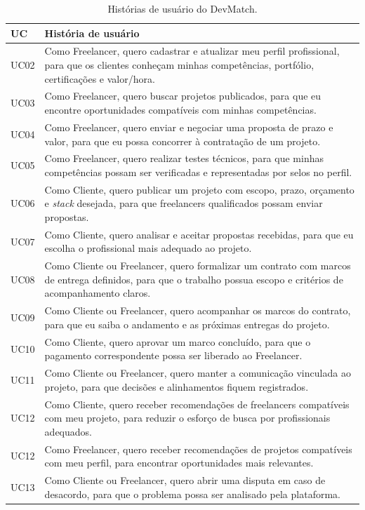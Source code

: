 \begin{table}[!htbp]
\centering
\caption{Histórias de usuário do DevMatch.}
\label{tab:historias}
\small
\begin{tabularx}{\textwidth}{@{}p{0.9cm}X@{}}
\toprule
\textbf{UC} & \textbf{História de usuário} \\
\midrule
UC02 & Como Freelancer, quero cadastrar e atualizar meu perfil profissional, para que os clientes conheçam minhas competências, portfólio, certificações e valor/hora. \\
UC03 & Como Freelancer, quero buscar projetos publicados, para que eu encontre oportunidades compatíveis com minhas competências. \\
UC04 & Como Freelancer, quero enviar e negociar uma proposta de prazo e valor, para que eu possa concorrer à contratação de um projeto. \\
UC05 & Como Freelancer, quero realizar testes técnicos, para que minhas competências possam ser verificadas e representadas por selos no perfil. \\
UC06 & Como Cliente, quero publicar um projeto com escopo, prazo, orçamento e \textit{stack} desejada, para que freelancers qualificados possam enviar propostas. \\
UC07 & Como Cliente, quero analisar e aceitar propostas recebidas, para que eu escolha o profissional mais adequado ao projeto. \\
UC08 & Como Cliente ou Freelancer, quero formalizar um contrato com marcos de entrega definidos, para que o trabalho possua escopo e critérios de acompanhamento claros. \\
UC09 & Como Cliente ou Freelancer, quero acompanhar os marcos do contrato, para que eu saiba o andamento e as próximas entregas do projeto. \\
UC10 & Como Cliente, quero aprovar um marco concluído, para que o pagamento correspondente possa ser liberado ao Freelancer. \\
UC11 & Como Cliente ou Freelancer, quero manter a comunicação vinculada ao projeto, para que decisões e alinhamentos fiquem registrados. \\
UC12 & Como Cliente, quero receber recomendações de freelancers compatíveis com meu projeto, para reduzir o esforço de busca por profissionais adequados. \\
UC12 & Como Freelancer, quero receber recomendações de projetos compatíveis com meu perfil, para encontrar oportunidades mais relevantes. \\
UC13 & Como Cliente ou Freelancer, quero abrir uma disputa em caso de desacordo, para que o problema possa ser analisado pela plataforma. \\

\end{tabularx}
\end{table}
